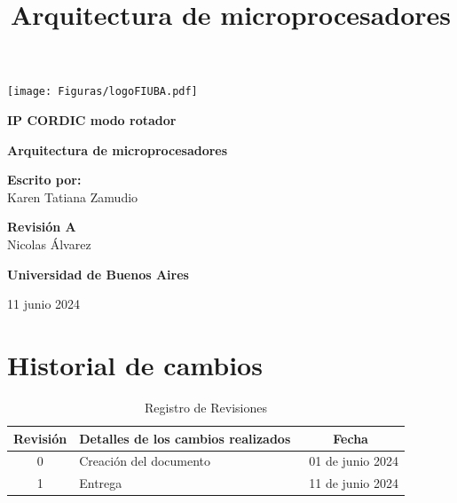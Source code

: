 \documentclass[12pt,a4paper, twoside]{article} %
\date{}
\title{Arquitectura de microprocesadores}
\begin{document}
\renewcommand\refname{}
\renewcommand{\contentsname}{Tabla de contenido}
\newpage

\begin{titlepage}
    \begin{center}
        \vspace*{1cm}

                \texttt{[image: Figuras/logoFIUBA.pdf]} %

        \vspace{1.5cm}

        \textbf{\LARGE IP CORDIC modo rotador}

        \vspace{4cm}
        \textbf{\Large Arquitectura de microprocesadores}

        \vspace{1.5cm}


        \textbf{\Large Escrito por:}\\
        \large Karen Tatiana Zamudio

        \vspace{0.8cm}

        \textbf{\Large Revisión A}\\
        \large Nicolas Álvarez

        \vfill

        \textbf{\Large Universidad de Buenos Aires}\\
        \vspace{0.2cm}

        \large  11 junio 2024

    \end{center}
\end{titlepage}
\newpage

\section*{Historial de cambios}
\label{sec:registro}

\begin{table}[ht]
  \centering
  \caption{Registro de Revisiones}
  \label{tab:registro}
  \begin{tabularx}{\linewidth}{|c|X|c|}
    \hline
    Revisión & Detalles de los cambios realizados & Fecha \\
    \hline
    0 & Creación del documento & \ 01 de junio 2024 \\
    \hline
    1 & Entrega  & \ 11 de junio 2024 \\
    \hline
  \end{tabularx}
\end{table}
\end{document}
